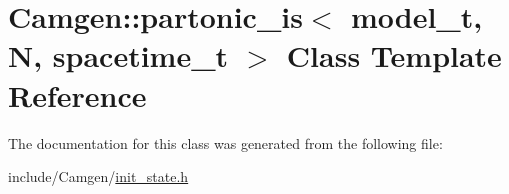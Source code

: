 \hypertarget{a00406}{\section{Camgen\-:\-:partonic\-\_\-is$<$ model\-\_\-t, N, spacetime\-\_\-t $>$ Class Template Reference}
\label{a00406}
}


The documentation for this class was generated from the following file\-:\begin{DoxyCompactItemize}
\item 
include/\-Camgen/\hyperlink{a00649}{init\-\_\-state.\-h}\end{DoxyCompactItemize}
